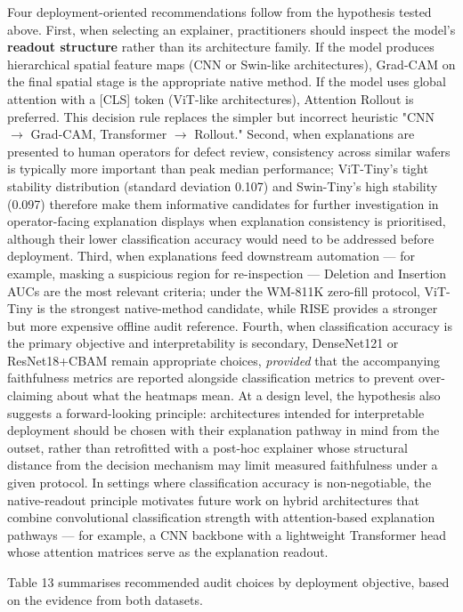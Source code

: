 \documentclass[11pt,a4paper]{article}
\begin{document}
Four deployment-oriented recommendations follow from the hypothesis tested above. First, when selecting an explainer, practitioners should inspect the model's \textbf{readout structure} rather than its architecture family. If the model produces hierarchical spatial feature maps (CNN or Swin-like architectures), Grad-CAM on the final spatial stage is the appropriate native method. If the model uses global attention with a [CLS] token (ViT-like architectures), Attention Rollout is preferred. This decision rule replaces the simpler but incorrect heuristic "CNN $\rightarrow$ Grad-CAM, Transformer $\rightarrow$ Rollout." Second, when explanations are presented to human operators for defect review, consistency across similar wafers is typically more important than peak median performance; ViT-Tiny's tight stability distribution (standard deviation 0.107) and Swin-Tiny's high stability (0.097)
therefore make them informative candidates for further investigation in operator-facing explanation displays when explanation consistency is prioritised, although their lower classification accuracy would need to be addressed before deployment. Third, when explanations feed downstream automation --- for example, masking a suspicious region for re-inspection --- Deletion and Insertion AUCs are the most relevant criteria; under the WM-811K zero-fill protocol, ViT-Tiny is the strongest native-method candidate, while RISE provides a stronger but more expensive offline audit reference. Fourth, when classification accuracy is the primary objective and interpretability is secondary, DenseNet121 or ResNet18+CBAM remain appropriate choices, \emph{provided} that the accompanying faithfulness metrics are reported alongside classification metrics to prevent over-claiming about what the heatmaps mean. At a design level, the hypothesis also suggests a forward-looking principle: architectures intended for
interpretable deployment should be chosen with their explanation pathway in mind from the outset, rather than retrofitted with a post-hoc explainer whose structural distance from the decision mechanism may limit measured faithfulness under a given protocol. In settings where classification accuracy is non-negotiable, the native-readout principle motivates future work on hybrid architectures that combine convolutional classification strength with attention-based explanation pathways --- for example, a CNN backbone with a lightweight Transformer head whose attention matrices serve as the explanation readout.

Table 13 summarises recommended audit choices by deployment objective, based on the evidence from both datasets.
\end{document}
